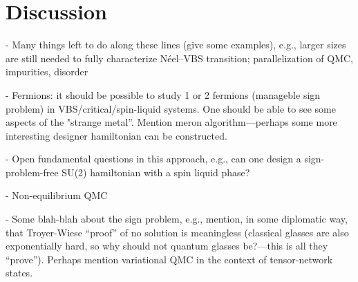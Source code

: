 \documentclass[aps,prb,groupedaddress,twocolumn]{revtex4}
\begin{document}
\section{Discussion}
- Many things left to do along these lines (give some examples), e.g., larger sizes are still needed
to fully characterize N\'eel--VBS transition; parallelization of QMC, impurities, disorder

- Fermions: it should be possible to study 1 or 2 fermions (manageble sign problem) in 
VBS/critical/spin-liquid systems. One should be able to see some aspects of the "strange metal''.
Mention meron algorithm---perhaps some more interesting designer hamiltonian can be constructed.

- Open fundamental questions in this approach, e.g., can one design a sign-problem-free
  SU(2) hamiltonian with a spin liquid phase?

- Non-equilibrium QMC

- Some blah-blah about the sign problem, e.g., mention, in some diplomatic way, that Troyer-Wiese ``proof'' of no 
solution is meaningless (classical glasses are also exponentially hard, so why should not quantum glasses be?---this
is all they ``prove''). Perhaps mention variational QMC in the context of tensor-network states.


\end{document}
